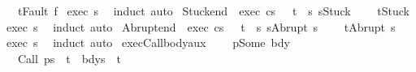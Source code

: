 \begin{isabellebody}
\ \ \ {\isachardoublequoteopen}t{\isacharequal}Fault\ f{\isachardoublequoteclose}\isanewline
%
\isadelimproof
%
\endisadelimproof
%
\isatagproof
{}\isamarkupfalse%
\ exec\ s\ \isamarkupfalse%
\ {\isacharparenleft}induct{\isacharparenright}\ auto%
\endisatagproof
{\isafoldproof}%
%
\isadelimproof
\isanewline
%
\endisadelimproof
\isanewline
{}\isamarkupfalse%
\ Stuck{\isacharunderscore}end{\isacharcolon}\ \ exec{\isacharcolon}\ {\isachardoublequoteopen}{\isasymGamma}{\isasymturnstile}{\isasymlangle}c{\isacharcomma}s{\isasymrangle}\ {\isasymRightarrow}\ \ t{\isachardoublequoteclose}\ \ s{\isacharcolon}\ {\isachardoublequoteopen}s{\isacharequal}Stuck{\isachardoublequoteclose}\ \isanewline
\ \ \ {\isachardoublequoteopen}t{\isacharequal}Stuck{\isachardoublequoteclose}\isanewline
%
\isadelimproof
%
\endisadelimproof
%
\isatagproof
{}\isamarkupfalse%
\ exec\ s\ \isamarkupfalse%
\ {\isacharparenleft}induct{\isacharparenright}\ auto%
\endisatagproof
{\isafoldproof}%
%
\isadelimproof
\isanewline
%
\endisadelimproof
\isanewline
{}\isamarkupfalse%
\ Abrupt{\isacharunderscore}end{\isacharcolon}\ \ exec{\isacharcolon}\ {\isachardoublequoteopen}{\isasymGamma}{\isasymturnstile}{\isasymlangle}c{\isacharcomma}s{\isasymrangle}\ {\isasymRightarrow}\ \ t{\isachardoublequoteclose}\ \ s{\isacharcolon}\ {\isachardoublequoteopen}s{\isacharequal}Abrupt\ s{\isacharprime}{\isachardoublequoteclose}\ \isanewline
\ \ \ {\isachardoublequoteopen}t{\isacharequal}Abrupt\ s{\isacharprime}{\isachardoublequoteclose}\isanewline
%
\isadelimproof
%
\endisadelimproof
%
\isatagproof
{}\isamarkupfalse%
\ exec\ s\ \isamarkupfalse%
\ {\isacharparenleft}induct{\isacharparenright}\ auto%
\endisatagproof
{\isafoldproof}%
%
\isadelimproof
\isanewline
%
\endisadelimproof
\isanewline
{}\isamarkupfalse%
\ exec{\isacharunderscore}Call{\isacharunderscore}body{\isacharunderscore}aux{\isacharcolon}\ \isanewline
\ \ {\isachardoublequoteopen}{\isasymGamma}\ p{\isacharequal}Some\ bdy\ {\isasymLongrightarrow}\ \isanewline
\ \ \ {\isasymGamma}{\isasymturnstile}{\isasymlangle}Call\ p{\isacharcomma}s{\isasymrangle}\ {\isasymRightarrow}\ t\ {\isacharequal}\ {\isasymGamma}{\isasymturnstile}{\isasymlangle}bdy{\isacharcomma}s{\isasymrangle}\ {\isasymRightarrow}\ t{\isachardoublequoteclose}\isanewline
%
\isadelimproof
%
\endisadelimproof
%
\isatagproof
{}\isamarkupfalse%

\end{isabellebody}
